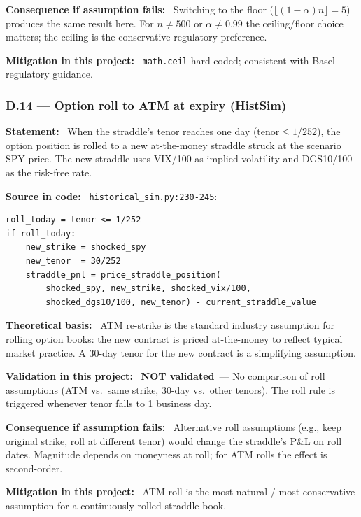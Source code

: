 \documentclass[11pt,a4paper]{article}
\newcommand{\asmfield}[1]{\medskip\noindent\textbf{#1:}\ }
\newcommand{\code}[1]{\texttt{#1}}
\newcommand{\notvalidated}{\textbf{NOT validated}}
\begin{document}
\asmfield{Consequence if assumption fails}
Switching to the floor ($\lfloor(1-\alpha)n\rfloor = 5$) produces the same
result here. For $n\ne 500$ or $\alpha \ne 0.99$ the ceiling/floor choice
matters; the ceiling is the conservative regulatory preference.

\asmfield{Mitigation in this project}
\code{math.ceil} hard-coded; consistent with Basel regulatory guidance.

\subsubsection{D.14 --- Option roll to ATM at expiry (HistSim)}\label{asm:D14}

\asmfield{Statement}
When the straddle's tenor reaches one day ($\text{tenor} \le 1/252$),
the option position is rolled to a new at-the-money straddle struck at
the scenario SPY price. The new straddle uses VIX/100 as implied
volatility and DGS10/100 as the risk-free rate.

\asmfield{Source in code}
\code{historical\_sim.py:230-245}:
\begin{lstlisting}
roll_today = tenor <= 1/252
if roll_today:
    new_strike = shocked_spy
    new_tenor  = 30/252
    straddle_pnl = price_straddle_position(
        shocked_spy, new_strike, shocked_vix/100,
        shocked_dgs10/100, new_tenor) - current_straddle_value
\end{lstlisting}

\asmfield{Theoretical basis}
ATM re-strike is the standard industry assumption for rolling option books:
the new contract is priced at-the-money to reflect typical market practice.
A 30-day tenor for the new contract is a simplifying assumption.

\asmfield{Validation in this project}
\notvalidated\ --- No comparison of roll assumptions (ATM vs.\ same strike,
30-day vs.\ other tenors). The roll rule is triggered whenever tenor falls
to 1 business day.

\asmfield{Consequence if assumption fails}
Alternative roll assumptions (e.g., keep original strike, roll at different
tenor) would change the straddle's P\&L on roll dates. Magnitude depends on
moneyness at roll; for ATM rolls the effect is second-order.

\asmfield{Mitigation in this project}
ATM roll is the most natural / most conservative assumption for a
continuously-rolled straddle book.
\end{document}
